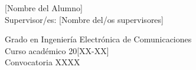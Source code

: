 \begin{center}
   \vspace{1.2cm}

  [Nombre del Alumno]\\

   \vspace{1.2cm}
  Supervisor/es: [Nombre del/os supervisores]
  
  \vspace{2.5cm}
  Grado en Ingeniería Electrónica de Comunicaciones\\
  Curso académico 20[XX-XX]\\
  Convocatoria XXXX\\



\end{center}




